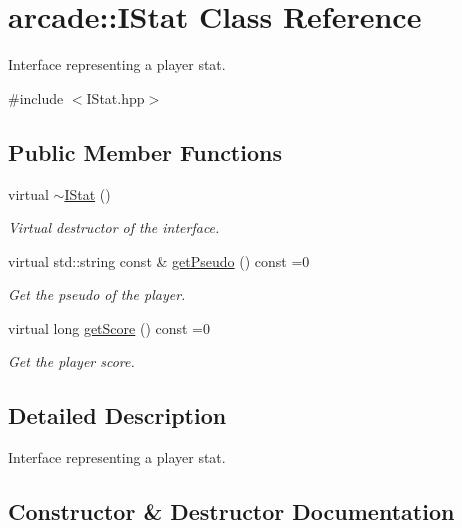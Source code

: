 \hypertarget{classarcade_1_1_i_stat}{}\section{arcade\+:\+:I\+Stat Class Reference}
\label{classarcade_1_1_i_stat}


Interface representing a player stat.  




{\ttfamily \#include $<$I\+Stat.\+hpp$>$}

\subsection*{Public Member Functions}
\begin{DoxyCompactItemize}
\item 
virtual \hyperlink{classarcade_1_1_i_stat_af8996c563dee5095d30592647fd0f00c}{$\sim$\+I\+Stat} ()
\begin{DoxyCompactList}\small\item\em Virtual destructor of the interface. \end{DoxyCompactList}\item 
virtual std\+::string const  \& \hyperlink{classarcade_1_1_i_stat_a6418289d2ae6b3d477ab8a9629487f18}{get\+Pseudo} () const =0
\begin{DoxyCompactList}\small\item\em Get the pseudo of the player. \end{DoxyCompactList}\item 
virtual long \hyperlink{classarcade_1_1_i_stat_acda674f38783f8d12db43103655642b7}{get\+Score} () const =0
\begin{DoxyCompactList}\small\item\em Get the player score. \end{DoxyCompactList}\end{DoxyCompactItemize}


\subsection{Detailed Description}
Interface representing a player stat. 

\subsection{Constructor \& Destructor Documentation}
\mbox{\label{classarcade_1_1_i_stat_af8996c563dee5095d30592647fd0f00c}} 

